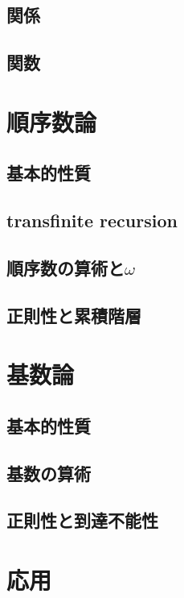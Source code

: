 \documentclass[a4paper]{bxjsarticle}
\theoremstyle{definition}
\begin{document}
    \subsection{関係}
    \subsection{関数}
    \newpage
    
    \section{順序数論}
    \subsection{基本的性質}
    \subsection{transfinite recursion}
    \subsection{順序数の算術と$\omega$}
    \subsection{正則性と累積階層}
    \newpage
    
    \section{基数論}
    \subsection{基本的性質}
    
    \subsection{基数の算術}
    
    \subsection{正則性と到達不能性}
    
    \newpage
    
    \section{応用}
\end{document}
